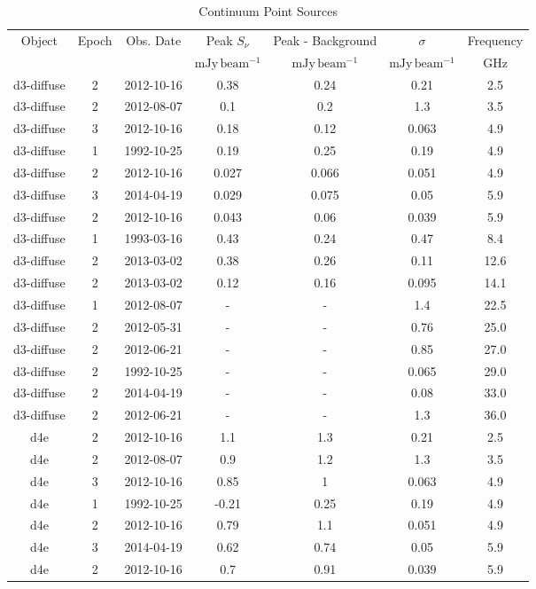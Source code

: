 \begin{table*}[htp]
\caption{Continuum Point Sources}
\begin{tabular}{ccccccc}
\label{tab:contsrcs_full}
Object & Epoch & Obs. Date & Peak $S_{\nu}$ & Peak - Background & $\sigma$ & Frequency \\
 &  &  & $\mathrm{mJy\,beam^{-1}}$ & $\mathrm{mJy\,beam^{-1}}$ & $\mathrm{mJy\,beam^{-1}}$ & $\mathrm{GHz}$ \\
\hline
d3-diffuse & 2 & 2012-10-16 & 0.38 & 0.24 & 0.21 & 2.5 \\
d3-diffuse & 2 & 2012-08-07 & 0.1 & 0.2 & 1.3 & 3.5 \\
d3-diffuse & 3 & 2012-10-16 & 0.18 & 0.12 & 0.063 & 4.9 \\
d3-diffuse & 1 & 1992-10-25 & 0.19 & 0.25 & 0.19 & 4.9 \\
d3-diffuse & 2 & 2012-10-16 & 0.027 & 0.066 & 0.051 & 4.9 \\
d3-diffuse & 3 & 2014-04-19 & 0.029 & 0.075 & 0.05 & 5.9 \\
d3-diffuse & 2 & 2012-10-16 & 0.043 & 0.06 & 0.039 & 5.9 \\
d3-diffuse & 1 & 1993-03-16 & 0.43 & 0.24 & 0.47 & 8.4 \\
d3-diffuse & 2 & 2013-03-02 & 0.38 & 0.26 & 0.11 & 12.6 \\
d3-diffuse & 2 & 2013-03-02 & 0.12 & 0.16 & 0.095 & 14.1 \\
d3-diffuse & 1 & 2012-08-07 & - & - & 1.4 & 22.5 \\
d3-diffuse & 2 & 2012-05-31 & - & - & 0.76 & 25.0 \\
d3-diffuse & 2 & 2012-06-21 & - & - & 0.85 & 27.0 \\
d3-diffuse & 2 & 1992-10-25 & - & - & 0.065 & 29.0 \\
d3-diffuse & 2 & 2014-04-19 & - & - & 0.08 & 33.0 \\
d3-diffuse & 2 & 2012-06-21 & - & - & 1.3 & 36.0 \\
d4e & 2 & 2012-10-16 & 1.1 & 1.3 & 0.21 & 2.5 \\
d4e & 2 & 2012-08-07 & 0.9 & 1.2 & 1.3 & 3.5 \\
d4e & 3 & 2012-10-16 & 0.85 & 1 & 0.063 & 4.9 \\
d4e & 1 & 1992-10-25 & -0.21 & 0.25 & 0.19 & 4.9 \\
d4e & 2 & 2012-10-16 & 0.79 & 1.1 & 0.051 & 4.9 \\
d4e & 3 & 2014-04-19 & 0.62 & 0.74 & 0.05 & 5.9 \\
d4e & 2 & 2012-10-16 & 0.7 & 0.91 & 0.039 & 5.9 \\

\end{tabular}
\end{table*}
